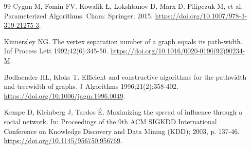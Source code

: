 \documentclass[preprint,11pt]{elsarticle}
\theoremstyle{definition}
\theoremstyle{remark}
\begin{document}
\begin{thebibliography}{99}
Cygan M, Fomin FV, Kowalik Ł, Lokshtanov D, Marx D, Pilipczuk M, et al. Parameterized Algorithms. Cham: Springer; 2015. \url{https://doi.org/10.1007/978-3-319-21275-3}.

Kinnersley NG. The vertex separation number of a graph equals its path-width. Inf Process Lett 1992;42(6):345-50. \url{https://doi.org/10.1016/0020-0190(92)90234-M}.

Bodlaender HL, Kloks T. Efficient and constructive algorithms for the pathwidth and treewidth of graphs. J Algorithms 1996;21(2):358-402. \url{https://doi.org/10.1006/jagm.1996.0049}.

Kempe D, Kleinberg J, Tardos É. Maximizing the spread of influence through a social network. In: Proceedings of the 9th ACM SIGKDD International Conference on Knowledge Discovery and Data Mining (KDD); 2003, p. 137-46. \url{https://doi.org/10.1145/956750.956769}.

\end{thebibliography}
\end{document}
